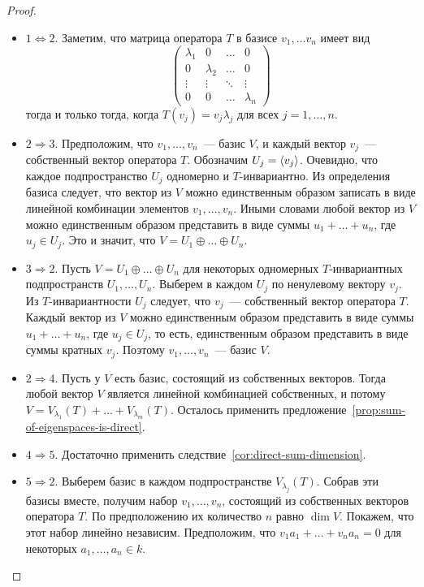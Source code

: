 \begin{proof}
\begin{itemize}
\item $1\Leftrightarrow 2$.
Заметим, что матрица оператора $T$ в базисе $v_1,\dots v_n$
имеет вид
$$
\begin{pmatrix}
\lambda_1 & 0 & \dots & 0 \\
0 & \lambda_2 & \dots & 0 \\
\vdots & \vdots & \ddots & \vdots \\
0 & 0 & \dots & \lambda_n
\end{pmatrix}
$$
тогда и только тогда, когда $T(v_j) = v_j\lambda_j$
для всех $j=1,\dots,n$.
\item $2\Rightarrow 3$. Предположим, что $v_1,\dots,v_n$~--- базис $V$,
и каждый вектор $v_j$~--- собственный вектор оператора $T$.
Обозначим $U_j = \langle v_j\rangle$. Очевидно, что каждое подпространство
$U_j$ одномерно и $T$-инвариантно. Из определения базиса
следует, что вектор из $V$ можно
единственным образом записать в виде линейной комбинации элементов
$v_1,\dots,v_n$. Иными словами любой вектор из $V$ можно единственным
образом представить в виде суммы $u_1+\dots+u_n$, где $u_j\in U_j$.
Это и значит, что $V = U_1\oplus \dots \oplus U_n$.
\item $3\Rightarrow 2$. Пусть $V=U_1\oplus\dots\oplus U_n$
для некоторых одномерных $T$-инвариантных подпространств
$U_1,\dots,U_n$. Выберем в каждом $U_j$ по ненулевому вектору
$v_j$. Из $T$-инвариантности $U_j$ следует, что $v_j$~--- собственный
вектор оператора $T$. Каждый вектор из $V$ можно единственным образом
представить в виде суммы $u_1+\dots+u_n$, где $u_j\in U_j$, то есть,
единственным образом представить в виде суммы кратных $v_j$.
Поэтому $v_1,\dots,v_n$~--- базис $V$.
\item $2\Rightarrow 4$. Пусть у $V$ есть базис, состоящий из
собственных векторов. Тогда любой вектор $V$ является линейной
комбинацией собственных, и потому
$V = V_{\lambda_1}(T) + \dots + V_{\lambda_m}(T)$.
Осталось применить предложение~\ref{prop:sum-of-eigenspaces-is-direct}.
\item $4\Rightarrow 5$. Достаточно применить
следствие~\ref{cor:direct-sum-dimension}.
\item $5\Rightarrow 2$. Выберем базис в каждом подпространстве
$V_{\lambda_j}(T)$. Собрав эти базисы вместе, получим
набор $v_1,\dots,v_n$, состоящий из собственных векторов
оператора $T$. По предположению их количество $n$ равно $\dim V$.
Покажем, что этот набор линейно независим. Предположим, что
$v_1a_1 + \dots + v_na_n = 0$ для некоторых $a_1,\dots,a_n\in k$.

\end{itemize}
\end{proof}
